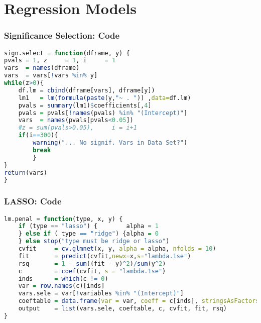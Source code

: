
\section{Regression Models}

\begin{frame}[fragile]
\frametitle{Significance Selection: Code}

\begin{lstlisting}[language=R]
sign.select = function(dframe, y) {
pvals = 1, z     = 1, i     = 1
vars  = names(dframe)
vars  = vars[!vars %in% y]
while(z>0){
    df.lm = cbind(dframe[vars], dframe[y])
    lm1   = lm(formula(paste(y,"~ . ")) ,data=df.lm)
    pvals = summary(lm1)$coefficients[,4]
    pvals = pvals[!names(pvals) %in% "(Intercept)"]
    vars  = names(pvals[pvals<0.05])
    #z = sum(pvals>0.05),     i = i+1
    if(i==300){
        warning("... No signif. Vars in Data Set?")
        break
        }
}
return(vars)
}

\end{lstlisting}

\end{frame}




\begin{frame}[fragile]
\frametitle{LASSO: Code}

\begin{lstlisting}[language=R]
lm.penal = function(type, x, y) {
    if (type == "lasso") {        alpha = 1
    } else if ( type == "ridge") {alpha = 0
    } else stop("type must be ridge or lasso")
    cvfit     = cv.glmnet(x, y, alpha = alpha, nfolds = 10)
    fit       = predict(cvfit,newx=x,s="lambda.1se")
    rsq       = 1 - sum((fit - y)^2)/sum(y^2)
    c         = coef(cvfit, s = "lambda.1se")
    inds      = which(c != 0)
    var = row.names(c)[inds]
    vars.sele = var[!variables %in% "(Intercept)"]
    coeftable = data.frame(var = var, coeff = c[inds], stringsAsFactors = F)
    output    = list(vars.sele, coeftable, c, cvfit, fit, rsq)
}

\end{lstlisting}

\end{frame}



